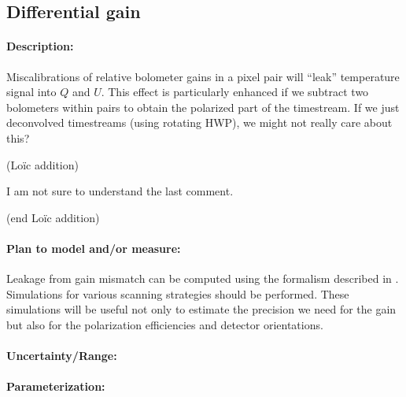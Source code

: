 \subsection{Differential gain}

\paragraph{Description:}
Miscalibrations of relative bolometer gains in a pixel pair will ``leak'' temperature signal into $Q$ and $U$.
This effect is particularly enhanced if we subtract two bolometers within pairs to obtain the polarized part of the timestream. If we just deconvolved timestreams (using rotating HWP), we might not really care about this?

(Loïc addition)

I am not sure to understand the last comment.

(end Loïc addition)


\paragraph{Plan to model and/or measure:}
Leakage from gain mismatch can be computed using the formalism described in \cite{rosset2010}. Simulations for various scanning strategies should be performed. These simulations will be useful not only to estimate the precision we need for the gain but also for the polarization efficiencies and detector orientations.

\paragraph{Uncertainty/Range:}

\paragraph{Parameterization:}
